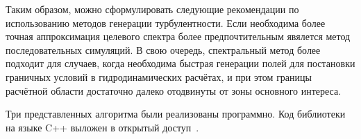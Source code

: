 Таким образом, можно сформулировать следующие рекомендации по использованию методов генерации турбулентности.
Если необходима более точная аппроксимация целевого спектра более предпочтительным явялется метод последовательных симуляций.
В свою очередь, спектральный метод более подходит для случаев,
когда необходима быстрая генерации полей для постановки граничных условий в гидродинамических расчётах,
и при этом границы расчётной области достаточно далеко отодвинуты от зоны основного интереса.

Три представленных алгоритма были реализованы программно. Код библиотеки на языке C++ выложен в открытый доступ~\cite{mycode}.
